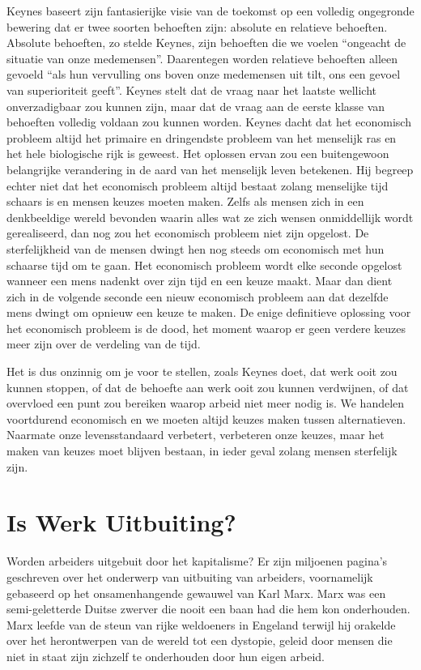 Keynes baseert zijn fantasierijke visie van de toekomst op een volledig
ongegronde bewering dat er twee soorten behoeften zijn: absolute en
relatieve behoeften. Absolute behoeften, zo stelde Keynes, zijn
behoeften die we voelen \enquote{ongeacht de situatie van onze medemensen}.
Daarentegen worden relatieve behoeften alleen gevoeld \enquote{als hun
vervulling ons boven onze medemensen uit tilt, ons een gevoel van
superioriteit geeft}.\autocite{46} Keynes stelt dat de
vraag naar het laatste wellicht onverzadigbaar zou kunnen zijn, maar dat
de vraag aan de eerste klasse van behoeften volledig voldaan zou kunnen
worden. Keynes dacht dat het economisch probleem altijd het primaire en
dringendste probleem van het menselijk ras en het hele biologische rijk
is geweest. Het oplossen ervan zou een buitengewoon belangrijke
verandering in de aard van het menselijk leven betekenen. Hij begreep
echter niet dat het economisch probleem altijd bestaat zolang menselijke
tijd schaars is en mensen keuzes moeten maken. Zelfs als mensen zich in
een denkbeeldige wereld bevonden waarin alles wat ze zich wensen
onmiddellijk wordt gerealiseerd, dan nog zou het economisch probleem
niet zijn opgelost. De sterfelijkheid van de mensen dwingt hen nog
steeds om economisch met hun schaarse tijd om te gaan. Het economisch
probleem wordt elke seconde opgelost wanneer een mens nadenkt over zijn
tijd en een keuze maakt. Maar dan dient zich in de volgende seconde een
nieuw economisch probleem aan dat dezelfde mens dwingt om opnieuw een
keuze te maken. De enige definitieve oplossing voor het economisch
probleem is de dood, het moment waarop er geen verdere keuzes meer zijn
over de verdeling van de tijd.

Het is dus onzinnig om je voor te stellen, zoals Keynes doet, dat werk
ooit zou kunnen stoppen, of dat de behoefte aan werk ooit zou kunnen
verdwijnen, of dat overvloed een punt zou bereiken waarop arbeid niet
meer nodig is. We handelen voortdurend economisch en we moeten altijd
keuzes maken tussen alternatieven. Naarmate onze levensstandaard
verbetert, verbeteren onze keuzes, maar het maken van keuzes moet
blijven bestaan, in ieder geval zolang mensen sterfelijk zijn.

\section{Is Werk Uitbuiting?}

Worden arbeiders uitgebuit door het kapitalisme? Er zijn miljoenen
pagina's geschreven over het onderwerp van uitbuiting
van arbeiders, voornamelijk gebaseerd op het onsamenhangende gewauwel
van Karl Marx. Marx was een semi-geletterde Duitse zwerver die nooit een
baan had die hem kon onderhouden. Marx leefde van de steun van rijke
weldoeners in Engeland terwijl hij orakelde over het herontwerpen van de
wereld tot een dystopie, geleid door mensen die niet in staat zijn
zichzelf te onderhouden door hun eigen arbeid.


